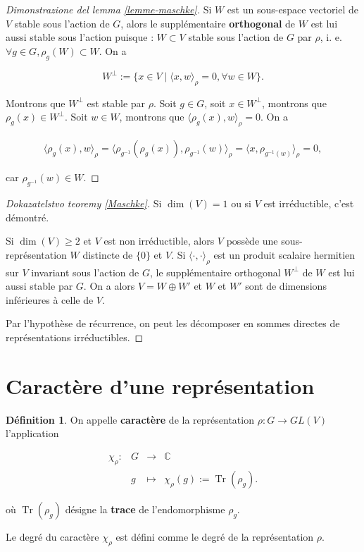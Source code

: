 \documentclass[french]{book}
\theoremstyle{definition}
\newtheorem{protodefinition}{Définition}[section]
\newenvironment{definition}
    {\colorlet{shadecolor}{green!5}\begin{shaded}\begin{protodefinition}}
    {\end{protodefinition}\end{shaded}}
\begin{document}
\begin{proof}[Dimonstrazione del lemma \ref{lemme-maschke}]
  Si \(W\) est un sous-espace vectoriel de \(V\) stable sous l'action de \(G\), alors le supplémentaire \textbf{orthogonal} de \(W\) est lui aussi stable sous l'action puisque : \(W \subset V\) stable sous l'action de \(G\) par \(\rho\), i. e. \( \forall g \in G, \rho_g(W) \subset W\). On a

  \[W ^{\perp} := \{  x \in V \mid \langle x, w \rangle _{\rho} = 0,  \forall w \in W \}.\]

  Montrons que \( W ^{\perp}\) est stable par \(\rho\). Soit \(g \in G\), soit \(x \in W ^{\perp}\), montrons que \(\rho_g(x) \in W ^{\perp}\). Soit \(w \in W\), montrons que \(\langle \rho_g(x), w \rangle _{\rho}=0\). On a

  \begin{gather*}
    \langle \rho_g(x), w \rangle_{\rho} = \langle \rho _{g ^{-1} }(\rho_g(x)), \rho _{g ^{-1} }(w) \rangle _{\rho} = \langle x, \rho _{g ^{-1} (w)} \rangle _{\rho} = 0,
  \end{gather*}

  car \(\rho _{g ^{-1} }(w) \in W\).
\end{proof}

\begin{proof}[Dokazatelstvo teoremy \ref{Maschke}]
  Si \(\operatorname{dim}(V)=1\) ou si \(V\) est irréductible, c'est démontré.

  Si \(\operatorname{dim}(V) \geq 2\) et \(V\) est non irréductible, alors \(V\) possède une sous-représentation \(W\) distincte de \(\{ 0 \} \) et \(V\). Si \(\langle \cdot, \cdot \rangle _{\rho}\) est un produit scalaire hermitien sur \(V\) invariant sous l'action de \(G\), le supplémentaire orthogonal \(W ^{\perp}\) de \(W\) est lui aussi stable par \(G\). On a alors \(V = W \oplus W'\) et \(W\) et \(W'\) sont de dimensions inférieures à celle de \(V\).

  Par l'hypothèse de récurrence, on peut les décomposer en sommes directes de représentations irréductibles.
\end{proof}

\section{Caractère d'une représentation}

\begin{definition}
  On appelle \textbf{caractère} de la représentation \(\rho : G \longrightarrow GL(V)\) l'application

  \[\begin{matrix}
  \chi_{\rho} : & G & \longrightarrow & \mathbb{C} \\
  \ & g & \longmapsto & \chi_{\rho}(g) := \operatorname{Tr}(\rho_g).
  \end{matrix}\]

  où \(\operatorname{Tr}(\rho_g)\) désigne la \textbf{trace} de l'endomorphisme \(\rho_g\).

  Le degré du caractère \(\chi_\rho\) est défini comme le degré de la représentation \(\rho\).
\end{definition}
\end{document}
